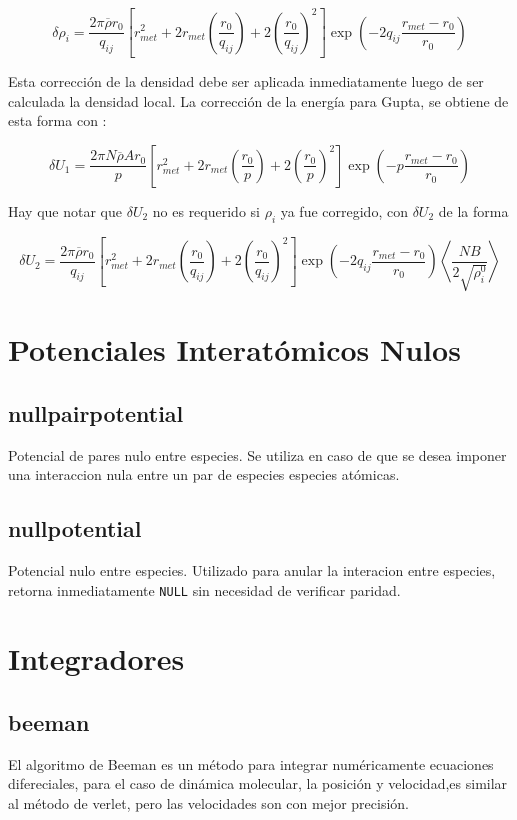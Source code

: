 $$\delta\rho_i=\frac{2\pi\overline{\rho}r_0}{q_{ij}}\left[r^2_{met}+2r_{met}\left(\frac{r_0}{q_{ij}}\right)+2\left(\frac{r_0}{q_{ij}}\right)^2\right]\exp{\left(-2q_{ij}\frac{r_{met}-r_0}{r_0}\right)}$$

Esta correcci\'on de la densidad debe ser aplicada inmediatamente luego de ser calculada la densidad local. La correcci\'on de la energ\'ia para Gupta, se obtiene de esta forma con :

$$\delta U_1 = \frac{2\pi N\overline{\rho}A r_0}{p}\left[r^2_{met}+2r_{met}\left(\frac{r_0}{p}\right)+2\left(\frac{r_0}{p}\right)^2\right]\exp{\left(-p\frac{r_{met}-r_0}{r_0}\right)}$$

Hay que notar que $\delta U_2$ no es requerido si $\rho_i$ ya fue corregido, con $\delta U_2$ de la forma

$$\delta U_2 = \frac{2\pi\overline{\rho} r_0}{q_{ij}}\left[r^2_{met}+2r_{met}\left(\frac{r_0}{q_{ij}}\right)+2\left(\frac{r_0}{q_{ij}}\right)^2\right]\exp{\left(-2q_{ij}\frac{r_{met}-r_0}{r_0}\right)}\left<\frac{NB}{2\sqrt{\rho_i^0}}\right>$$


\section{Potenciales Interat\'omicos Nulos}
\subsection{nullpairpotential}
Potencial de pares nulo entre especies. Se utiliza en caso de que se desea imponer una interaccion nula entre un par de especies especies at\'omicas. 
\subsection{nullpotential}
Potencial nulo entre especies. Utilizado para anular la interacion entre especies, retorna inmediatamente \verb|NULL| sin necesidad de verificar paridad.

\section{Integradores}
\subsection{beeman}
El algoritmo de Beeman es un m\'etodo para integrar num\'ericamente ecuaciones difereciales, para el caso de din\'amica molecular, la posici\'on y velocidad,es similar al m\'etodo de verlet, pero las velocidades son con mejor precisi\'on.

